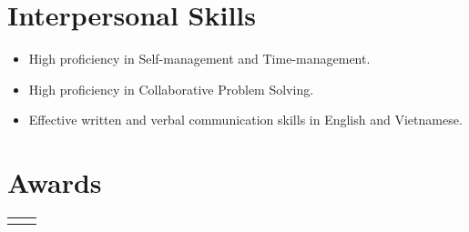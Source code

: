 \documentclass[12pt]{article} %
\begin{document}
\begin{paracol}{2}

\section{Interpersonal Skills}

\begin{itemize}
	\item High proficiency in Self-management and Time-management.
	\item High proficiency in Collaborative Problem Solving.
	\item Effective written and verbal communication skills in English and Vietnamese.
\end{itemize}	


\section{Awards}





\begin{supertabular}{rl} %
	
	
	
	
	
	

\end{supertabular}
\end{paracol}
\end{document}
